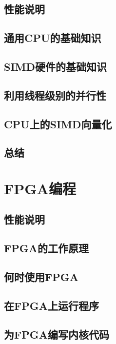 \documentclass[11pt,a4paper,UTF8]{ctexart}
\begin{document}
		\subsection{性能说明}
		
		\subsection{通用CPU的基础知识}
		
		\subsection{SIMD硬件的基础知识}
		
		\subsection{利用线程级别的并行性}
		
		\subsection{CPU上的SIMD向量化}
		
		\subsection{总结}
		
	\section{FPGA编程}
	
		\subsection{性能说明}
		
		\subsection{FPGA的工作原理}
		
		\subsection{何时使用FPGA}
		
		\subsection{在FPGA上运行程序}
		
		\subsection{为FPGA编写内核代码}
		
\end{document}
